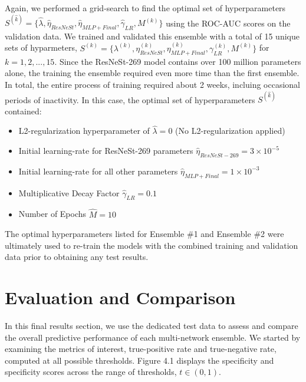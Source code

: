 \documentclass [MAS] {uclathes}
\begin{document}
Again, we performed a grid-search to find the optimal set of hyperparameters $S^{(\hat k)} = \{\hat \lambda, \hat \eta_{ResNeSt}, \hat \eta_{MLP + Final}, \hat \gamma_{LR}, M^{(k)}\}$ using the ROC-AUC scores on the validation data. We trained and validated this ensemble with a total of 15 unique sets of hyparmeters, $S^{(k)} = \{\lambda^{(k)}, \eta_{ResNeSt}^{(k)}, \eta_{MLP+Final}^{(k)}, \gamma_{LR}^{(k)}, M^{(k)}\}$ for $k=1, 2, ..., 15$. Since the ResNeSt-269 model contains over 100 million parameters alone, the training the ensemble required even more time than the first ensemble. In total, the entire process of training required about 2 weeks, incluing occasional periods of inactivity. In this case, the optimal set of hyperparameters $S^{(\hat k)}$ contained:

\begin{itemize}
    \item L2-regularization hyperparameter of $\hat \lambda = 0$ (No L2-regularization applied)
    \item Initial learning-rate for ResNeSt-269 parameters $\hat \eta_{ResNeSt-269} = 3 \times 10^{-5}$
    \item Initial learning-rate for all other parameters $\hat \eta_{MLP+Final} = 1 \times 10^{-3}$
    \item Multiplicative Decay Factor $\hat \gamma_{LR} = 0.1$
    \item Number of Epochs $\hat M=10$
\end{itemize}

The optimal hyperparameters listed for Ensemble \#1 and Ensemble \#2 were ultimately used to re-train the models with the combined training and validation data prior to obtaining any test results.


\section{Evaluation and Comparison}

In this final results section, we use the dedicated test data to assess and compare the overall predictive performance of each
multi-network ensemble. We started by examining the metrics of interest, true-positive rate and true-negative rate, computed at all possible thresholds. Figure 4.1 displays the specificity and specificity scores across the range of thresholds, $t \in (0, 1)$.
\end{document}
